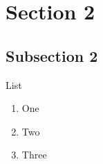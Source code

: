 
\section{Section 2}
\subsection{Subsection 2}

\begin{slide}{List}
    \vspace*{\fill}
    \begin{enumerate}
        \item One
        \item Two
        \item Three
    \end{enumerate}
    \vspace*{\fill}
\end{slide}
